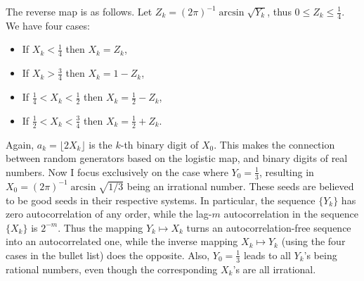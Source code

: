\documentclass[oneside,10pt]{book}
\begin{document}
\noindent The reverse map is as follows. Let $Z_k = (2\pi)^{-1}\arcsin\sqrt{Y_k}$, thus $0\leq Z_k\leq\frac{1}{4}$. We have four cases: \vspace{1ex}
\begin{itemize}
\item   If $X_k < \frac{1}{4}$  then $X_k=Z_k$,  %
\item   If $X_k > \frac{3}{4}$  then $X_k = 1 - Z_k$,  %
\item   If $\frac{1}{4} < X_k < \frac{1}{2}$ then $X_k  = \frac{1}{2} - Z_k$, %
\item   If $\frac{1}{2} < X_k < \frac{3}{4}$ then  $X_k=\frac{1}{2} + Z_k$. %
\end{itemize}\vspace{1ex}
Again, $a_k=\lfloor 2X_k\rfloor$ is the $k$-th binary digit of $X_0$. This makes the connection between random generators based on the logistic map, and binary digits of real numbers. 
Now I focus exclusively on the case where $Y_0=\frac{1}{3}$, resulting in 
$X_0=(2\pi)^{-1}\arcsin \sqrt{1/3}$ being an irrational number. These seeds
 are believed to be \textcolor{index}{good seeds} in their respective systems. 
 In particular, the sequence $\{Y_k\}$ has zero autocorrelation of any order, while the lag-$m$ autocorrelation in the sequence
 $\{X_k\}$ is $2^{-m}$. 
Thus the mapping $Y_k \mapsto X_k$ turns an autocorrelation-free sequence into an autocorrelated one,
 while the inverse mapping $X_k \mapsto Y_k$ (using the four cases in the bullet list) does the opposite. 
Also, $Y_0=\frac{1}{3}$ leads to all $Y_k$'s being rational numbers, even though
 the corresponding $X_k$'s are all irrational.
\end{document}
